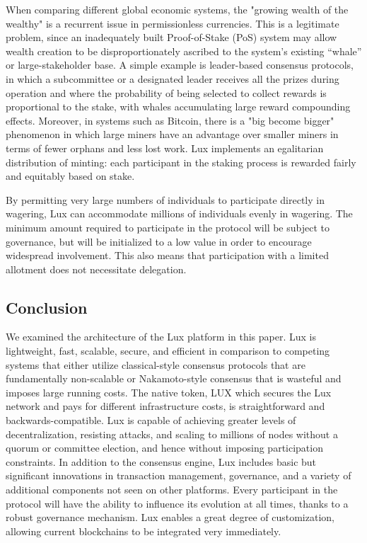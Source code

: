 \documentclass[11pt]{article}
\begin{document}
When comparing different global economic systems,  the "growing wealth of the wealthy" is a recurrent issue in permissionless currencies. This is a legitimate problem, since an inadequately built Proof-of-Stake (PoS) system may allow wealth creation to be disproportionately ascribed to the system's existing ``whale'' or large-stakeholder base. A simple example is leader-based consensus protocols, in which a subcommittee or a designated leader receives all the prizes during operation and where the probability of being selected to collect rewards is proportional to the stake, with whales accumulating large reward compounding effects. Moreover, in systems such as Bitcoin, there is a "big become bigger" phenomenon in which large miners have an advantage over smaller miners in terms of fewer orphans and less lost work. Lux implements an egalitarian distribution of minting: each participant in the staking process is rewarded fairly and equitably based on stake.


By permitting very large numbers of individuals to participate directly in wagering, Lux can accommodate millions of individuals evenly in wagering. The minimum amount required to participate in the protocol will be subject to governance, but will be initialized to a low value in order to encourage widespread involvement. This also means that participation with a limited allotment does not necessitate delegation.


\subsection{Conclusion}

We examined the architecture of the Lux platform in this paper. Lux is lightweight, fast, scalable, secure, and efficient in comparison to competing systems that either utilize classical-style consensus protocols that are fundamentally non-scalable or Nakamoto-style consensus that is wasteful and imposes large running costs. The native token, LUX which secures the Lux network and pays for different infrastructure costs, is straightforward and backwards-compatible. Lux is capable of achieving greater levels of decentralization, resisting attacks, and scaling to millions of nodes without a quorum or committee election, and hence without imposing participation constraints. In addition to the consensus engine, Lux includes basic but significant innovations in transaction management, governance, and a variety of additional components not seen on other platforms. Every participant in the protocol will have the ability to influence its evolution at all times, thanks to a robust governance mechanism. Lux enables a great degree of customization, allowing current blockchains to be integrated very immediately.
\end{document}
